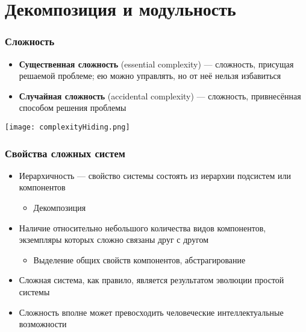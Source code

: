 \documentclass{../../slides-style}
\begin{document}
    \begin{frame}[plain]
        \titlepage
    \end{frame}

    \section{Декомпозиция и модульность}

    \begin{frame}
        \frametitle{Сложность}
        \begin{itemize}
            \item \textbf{Существенная сложность} (essential complexity) --- сложность, присущая решаемой проблеме; ею можно управлять, но от неё нельзя избавиться
            \item \textbf{Случайная сложность} (accidental complexity) --- сложность, привнесённая способом решения проблемы
        \end{itemize}
        \vskip 0.5cm
        \begin{center}
            \texttt{[image: complexityHiding.png]}
        \end{center}
    \end{frame}

    \begin{frame}
        \frametitle{Свойства сложных систем}
        \begin{itemize}
            \item Иерархичность --- свойство системы состоять из иерархии подсистем или компонентов
            \begin{itemize}
                \item Декомпозиция
            \end{itemize}
            \item Наличие относительно небольшого количества видов компонентов, экземпляры которых сложно связаны друг с другом
            \begin{itemize}
                \item Выделение общих свойств компонентов, абстрагирование
            \end{itemize}
            \item Сложная система, как правило, является результатом эволюции простой системы
            \item Сложность вполне может превосходить человеческие интеллектуальные возможности
        \end{itemize}
    \end{frame}
\end{document}
